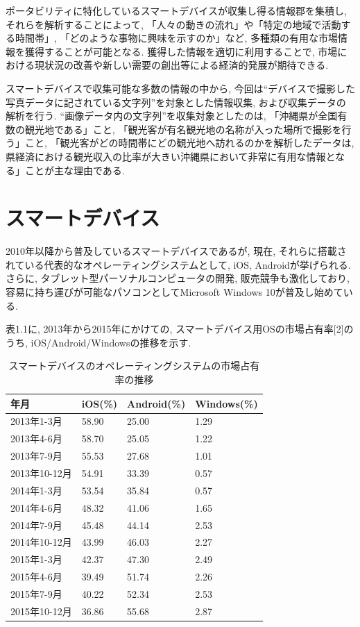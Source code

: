 ポータビリティに特化しているスマートデバイスが収集し得る情報郡を集積し, それらを解析することによって, 「人々の動きの流れ」や「特定の地域で活動する時間帯」, 「どのような事物に興味を示すのか」など, 多種類の有用な市場情報を獲得することが可能となる.
獲得した情報を適切に利用することで, 市場における現状況の改善や新しい需要の創出等による経済的発展が期待できる.

スマートデバイスで収集可能な多数の情報の中から, 今回は“デバイスで撮影した写真データに記されている文字列”を対象とした情報収集, および収集データの解析を行う.
“画像データ内の文字列”を収集対象としたのは, 「沖縄県が全国有数の観光地である」こと, 「観光客が有名観光地の名称が入った場所で撮影を行う」こと, 「観光客がどの時間帯にどの観光地へ訪れるのかを解析したデータは, 県経済における観光収入の比率が大きい沖縄県において非常に有用な情報となる」ことが主な理由である.

\section{スマートデバイス}
2010年以降から普及しているスマートデバイスであるが, 現在, それらに搭載されている代表的なオペレーティングシステムとして, iOS, Androidが挙げられる.
さらに, タブレット型パーソナルコンピュータの開発, 販売競争も激化しており, 容易に持ち運びが可能なパソコンとしてMicrosoft Windows 10が普及し始めている.

表1.1に, 2013年から2015年にかけての, スマートデバイス用OSの市場占有率[2]のうち, iOS/Android/Windowsの推移を示す.

\begin{table}[htb]
\begin{center}
\begin{tabular}{|l|p{3cm}|p{3cm}|p{3cm}|} \hline
年月 & iOS(\%) & Android(\%) & Windows(\%) \\ \hline \hline
2013年1-3月 & 58.90 & 25.00 & 1.29 \\ \hline
2013年4-6月 & 58.70 & 25.05 & 1.22 \\ \hline
2013年7-9月 & 55.53 & 27.68 & 1.01 \\ \hline
2013年10-12月 & 54.91 & 33.39 & 0.57 \\ \hline
2014年1-3月 & 53.54 & 35.84 & 0.57 \\ \hline
2014年4-6月 & 48.32 & 41.06 & 1.65 \\ \hline
2014年7-9月 & 45.48 & 44.14 & 2.53 \\ \hline
2014年10-12月 & 43.99 & 46.03 & 2.27 \\ \hline
2015年1-3月 & 42.37 & 47.30 & 2.49 \\ \hline
2015年4-6月 & 39.49 & 51.74 & 2.26 \\ \hline
2015年7-9月 & 40.22 & 52.34 & 2.53 \\ \hline
2015年10-12月 & 36.86 & 55.68 & 2.87 \\ \hline
\end{tabular}
\caption{スマートデバイスのオペレーティングシステムの市場占有率の推移}
\end{center}
\end{table}

